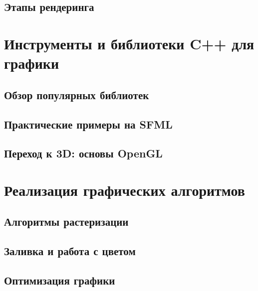 \documentclass[referat]{SCWorks}
\begin{document}

\subsection{Этапы рендеринга}


\section{Инструменты и библиотеки C++ для графики}

\subsection{Обзор популярных библиотек}



\subsection{Практические примеры на SFML}



\subsection{Переход к 3D: основы OpenGL}

% 

\section{Реализация графических алгоритмов}

\subsection{Алгоритмы растеризации}


\subsection{Заливка и работа с цветом}


\subsection{Оптимизация графики}

\end{document}
